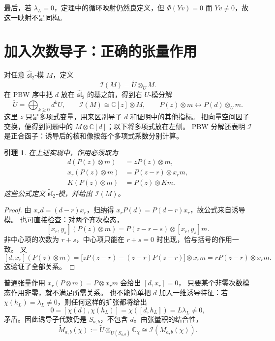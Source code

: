 \documentclass[UTF8,11pt]{ctexart}
\newcommand{\C}{\mathbb C}
\newcommand{\g}{\widehat{\mathfrak{sl}}_2}
\newcommand{\gt}{\widetilde{\mathfrak{sl}}_2}
\newcommand{\I}{\mathcal I}
\newtheorem{lemma}[theorem]{引理}
\theoremstyle{definition}
\begin{document}
最后，若 \(\lambda_L=0\)，定理中的循环映射仍然良定义，但
\(\Phi(Yv)=0\) 而 \(Yv\ne0\)，故这一映射不是同构。

\section{加入次数导子：正确的张量作用}

对任意 \(\g\)-模 \(M\)，定义
\[
 \I(M)=\widetilde U\otimes_U M.
\]
在 PBW 序中把 \(d\) 放在 \(\g\) 的基之前，得到右 \(U\)-模分解
\[
 \widetilde U=\bigoplus_{k\ge0}d^kU,\qquad
 \I(M)\cong\C[z]\otimes M,\qquad P(z)\otimes m\longleftrightarrow P(d)\otimes_U m.
\]
这里 \(z\) 只是多项式变量，用来区别导子 \(d\) 和证明中的其他指标。
把向量空间因子交换，便得到问题中的 \(M\otimes\C[d]\)；以下将多项式放在左侧。
PBW 分解还表明 \(\I\) 是正合函子：诱导后的核和像按每个多项式系数分别计算。

\begin{lemma}\label{lem:shift-action}
在上述实现中，作用必须取为
\begin{equation}\label{eq:shift-action}
\begin{aligned}
 d(P(z)\otimes m)&=zP(z)\otimes m,\\
 x_r(P(z)\otimes m)&=P(z-r)\otimes x_rm,\\
 K(P(z)\otimes m)&=P(z)\otimes Km.
\end{aligned}
\end{equation}
这些公式定义 \(\gt\)-模，并给出 \(\I(M)\)。
\end{lemma}
\begin{proof}
由 \(x_rd=(d-r)x_r\)，归纳得 \(x_rP(d)=P(d-r)x_r\)，故公式来自诱导模。
也可直接检查：对两个齐次模态，
\[
 [x_r,y_s](P(z)\otimes m)=P(z-r-s)\otimes[x_r,y_s]m.
\]
非中心项的次数为 \(r+s\)，中心项只能在 \(r+s=0\) 时出现，恰与括号的作用一致。
又
\[
 [d,x_r](P(z)\otimes m)
 =\bigl[zP(z-r)-(z-r)P(z-r)\bigr]\otimes x_rm
 =rP(z-r)\otimes x_rm.
\]
这验证了全部关系。
\end{proof}

普通张量作用 \(x_r(P\otimes m)=P\otimes x_rm\) 会给出 \([d,x_r]=0\)，
只要某个非零次数模态作用非零，就不满足所需关系。
也不能简单把 \(d\) 加入一维诱导特征：若 \(\chi(h_L)=\lambda_L\ne0\)，则任何这样的扩张都将给出
\[
 0=[\chi(d),\chi(h_L)]=\chi([d,h_L])=L\lambda_L\ne0,
\]
矛盾。因此诱导子代数仍是 \(S_{a,b}\)，不包含 \(d\)。由张量积的结合性，
\begin{equation}\label{eq:induction-transitivity}
 \widetilde M_{a,b}(\chi):=\widetilde U\otimes_{U(S_{a,b})}\C_\chi
 \cong\I(M_{a,b}(\chi)).
\end{equation}
\end{document}
